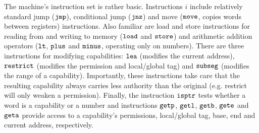 \documentclass[acmsmall,review]{acmart}\settopmatter{printfolios=true}
\newcommand{\zinstr}[1]{\mathtt{#1}}
\newcommand{\oneinstr}[2]{
  \ifthenelse{\equal{#2}{}}
  {\zinstr{#1}}
  {\zinstr{#1} \; #2}
}
\newcommand{\jmp}[1]{\oneinstr{jmp}{#1}}
\newcommand{\twoinstr}[3]{
  \ifthenelse{\equal{#2#3}{}}
  {\zinstr{#1}}
  {\zinstr{#1} \; #2 \; #3}
}
\newcommand{\restricttwo}[2]{\twoinstr{restrict}{#1}{#2}}
\newcommand{\jnz}[2]{\twoinstr{jnz}{#1}{#2}}
\newcommand{\isptr}[2]{\twoinstr{isptr}{#1}{#2}}
\newcommand{\geta}[2]{\twoinstr{geta}{#1}{#2}}
\newcommand{\getb}[2]{\twoinstr{getb}{#1}{#2}}
\newcommand{\gete}[2]{\twoinstr{gete}{#1}{#2}}
\newcommand{\getp}[2]{\twoinstr{getp}{#1}{#2}}
\newcommand{\getl}[2]{\twoinstr{getl}{#1}{#2}}
\newcommand{\move}[2]{\twoinstr{move}{#1}{#2}}
\newcommand{\store}[2]{\twoinstr{store}{#1}{#2}}
\newcommand{\load}[2]{\twoinstr{load}{#1}{#2}}
\newcommand{\lea}[2]{\twoinstr{lea}{#1}{#2}}
\newcommand{\threeinstr}[4]{
  \ifthenelse{\equal{#2#3#4}{}}
  {\zinstr{#1}}
  {\zinstr{#1} \; #2 \; #3 \; #4}
}
\newcommand{\subseg}[3]{\threeinstr{subseg}{#1}{#2}{#3}}
\newcommand{\plus}[3]{\threeinstr{plus}{#1}{#2}{#3}}
\newcommand{\minus}[3]{\threeinstr{minus}{#1}{#2}{#3}}
\newcommand{\lt}[3]{\threeinstr{lt}{#1}{#2}{#3}}
\begin{document}
The machine's instruction set is rather basic. Instructions $i$ include
relatively standard jump ($\jmp{}$), conditional jump ($\jnz{}{}$) and move
($\move{}{}$, copies words between registers) instructions. Also familiar are
load and store instructions for reading from and writing to memory ($\load{}{}$
and $\store{}{}$) and arithmetic addition operators ($\lt{}{}{}$, $\plus{}{}{}$ and
$\minus{}{}{}$, operating only on numbers). There are three instructions for
modifying capabilities: $\lea{}{}$ (modifies the current address),
$\restricttwo{}{}$ (modifies the permission and local/global tag) and
$\subseg{}{}{}$ (modifies the range of a capability). Importantly, these
instructions take care that the resulting capability always carries less
authority than the original (e.g. restrict will only weaken a permission).
Finally, the instruction $\isptr{}{}$ tests whether a word is a capability or a
number and instructions $\getp{}{}$, $\getl{}{}$, $\getb{}{}$, $\gete{}{}$ and
$\geta{}{}$ provide access to a capability's permissions, local/global tag, base,
end and current address, respectively.
\end{document}
